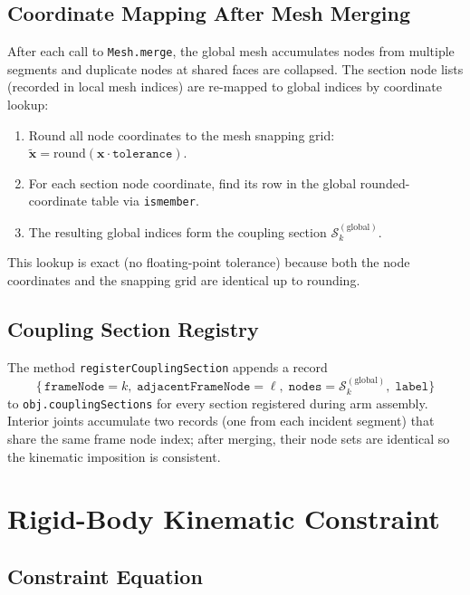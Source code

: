 \documentclass{article}
\begin{document}
\subsection{Coordinate Mapping After Mesh Merging}

After each call to \texttt{Mesh.merge}, the global mesh accumulates nodes from
multiple segments and duplicate nodes at shared faces are collapsed.  The
section node lists (recorded in local mesh indices) are re-mapped to global
indices by coordinate lookup:
\begin{enumerate}
    \item Round all node coordinates to the mesh snapping grid:
          $\tilde{\bm{x}} = \mathrm{round}(\bm{x} \cdot \texttt{tolerance})$.
    \item For each section node coordinate, find its row in the global
          rounded-coordinate table via \texttt{ismember}.
    \item The resulting global indices form the coupling section
          $\mathcal{S}_k^{(\text{global})}$.
\end{enumerate}
This lookup is exact (no floating-point tolerance) because both the node
coordinates and the snapping grid are identical up to rounding.

\subsection{Coupling Section Registry}

The method \texttt{registerCouplingSection} appends a record
\begin{equation}
    \bigl\{\,\texttt{frameNode}=k,\;\texttt{adjacentFrameNode}=\ell,\;
    \texttt{nodes}=\mathcal{S}_k^{(\text{global})},\;\texttt{label}\bigr\}
\end{equation}
to \texttt{obj.couplingSections} for every section registered during arm
assembly.  Interior joints accumulate two records (one from each incident
segment) that share the same frame node index; after merging, their node
sets are identical so the kinematic imposition is consistent.

\section{Rigid-Body Kinematic Constraint}
\label{sec:kinematics}

\subsection{Constraint Equation}
\end{document}
